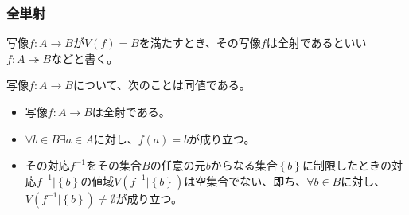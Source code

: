 \documentclass[dvipdfmx]{jsarticle}
\begin{document}
\subsubsection{全単射}%
\begin{dfn}
写像$f:A \rightarrow B$が$V(f) = B$を満たすとき、その写像$f$は全射であるといい$f:A \twoheadrightarrow B$などと書く。
\end{dfn}
\begin{thm}
\label{1.2.3.7}
写像$f:A \rightarrow B$について、次のことは同値である。
\begin{itemize}
\item
  写像$f:A \rightarrow B$は全射である。
\item
  $\forall b \in B\exists a \in A$に対し、$f(a) = b$が成り立つ。
\item
  その対応$f^{- 1}$をその集合$B$の任意の元$b$からなる集合$\left\{ b \right\}$に制限したときの対応$f^{- 1}|\left\{ b \right\}$の値域$V\left( f^{- 1}|\left\{ b \right\} \right)$は空集合でない、即ち、$\forall b \in B$に対し、$V\left( f^{- 1}|\left\{ b \right\} \right) \neq \emptyset$が成り立つ。
\end{itemize}
\end{thm}
\end{document}
